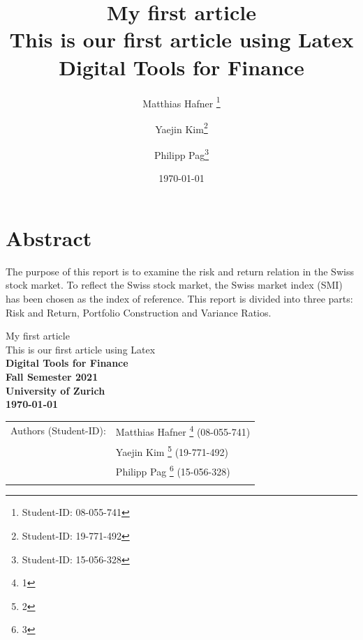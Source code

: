 \documentclass{article}
\begin{document}
	
	


\title{\Huge My first article  \\ \vspace*{0.5cm} \LARGE This is our first article using Latex \\ \vspace*{2cm} \Large \bf Digital Tools for Finance }
\author{Matthias Hafner \thanks{Student-ID: 08-055-741} \and Yaejin Kim\thanks{Student-ID: 19-771-492}  \and Philipp Pag\thanks{Student-ID: 15-056-328}}
\date{\today}
\maketitle
	
\vspace*{1cm}	
	
\section*{Abstract}

The purpose of this report is to examine the risk and return relation in the Swiss stock market. To reflect the Swiss stock market, the Swiss market index (SMI) has been chosen as the index of reference. This report is divided into three parts: Risk and Return, Portfolio Construction and Variance Ratios. \blindtext


\newpage



\vspace*{2cm}


\begin{center}
	
	\thispagestyle{empty}
	
	{\Huge My first article}\\[0.5cm]
	{\LARGE This is our first article using Latex}\\[1.5cm]
	
	{\Large \bf Digital Tools for Finance}\\[1cm]
	
	{\bf \large Fall Semester 2021\\
		University of Zurich}\\[1cm]
	
	{\large \bf \today }\\[2cm]
	
	
	\begin{tabular}{ll}
		\hline
		{Authors (Student-ID):} 
		& { Matthias Hafner \thanks{1} (08-055-741)  } \\
		& { Yaejin Kim \thanks{2} (19-771-492)} \\
		& { Philipp Pag \thanks{3} (15-056-328) }\\
		\hline \\
	\end{tabular}
	
\end{center}
\end{document}
